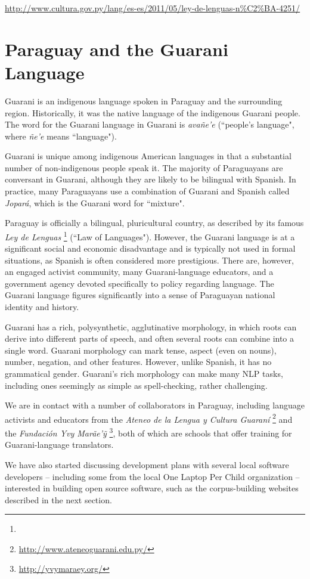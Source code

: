 \urldef{\leydelenguas}\url{http://www.cultura.gov.py/lang/es-es/2011/05/ley-de-lenguas-n%C2%BA-4251/}

\section{Paraguay and the Guarani Language}
Guarani is an indigenous language spoken in Paraguay and the surrounding
region.
Historically, it was the native language of the indigenous Guarani people. The
word for the Guarani language in Guarani is \emph{avañe'e} (``people's
language", where \emph{ñe'e} means ``language").

Guarani is unique among indigenous American languages in that a substantial
number of non-indigenous people speak it.  The majority of Paraguayans are
conversant in Guarani, although they are likely to be bilingual with Spanish.
In practice, many Paraguayans use a combination of Guarani and Spanish called
\emph{Jopar{\'a}}, which is the Guarani word for ``mixture".

Paraguay is officially a bilingual, pluricultural country, as described by its
famous \emph{Ley de Lenguas} \footnote{\leydelenguas} (``Law of Languages").
However, the Guarani language is at a significant social and economic
disadvantage and is typically not used in formal situations, as Spanish is
often considered more prestigious. There are, however, an engaged activist
community, many Guarani-language educators, and a government agency devoted
specifically to policy regarding language.
The Guarani language figures significantly into a sense of Paraguayan national
identity and history.

Guarani has a rich, polysynthetic, agglutinative morphology, in which roots can
derive into different parts of speech, and often several roots can combine into
a single word. Guarani morphology can mark tense, aspect (even on nouns),
number, negation, and other features. However, unlike Spanish, it has no
grammatical gender.  Guarani's rich morphology can make many NLP tasks,
including ones seemingly as simple as spell-checking, rather challenging.

We are in contact with a number of collaborators in Paraguay, including
language activists and educators from the \emph{Ateneo de la Lengua y Cultura
Guaraní} \footnote{\url{http://www.ateneoguarani.edu.py/}} and the
\emph{Fundación Yvy Marãe'{\~y}} \footnote{\url{http://yvymaraey.org/}},
both of which are schools that offer training for Guarani-language translators.

We have also started discussing development plans with several local software
developers -- including some from the local One Laptop Per Child organization
-- interested in building open source software, such as the corpus-building
websites described in the next section.

